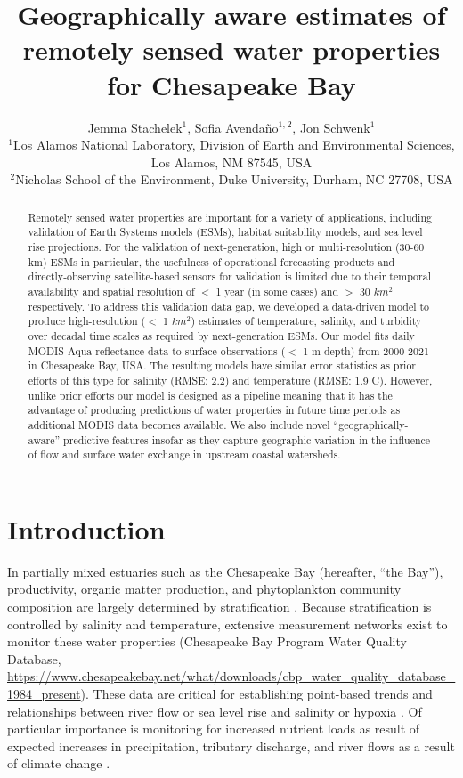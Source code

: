 \documentclass{article}
\title{Geographically aware estimates of remotely sensed water properties for Chesapeake Bay}
\author{Jemma Stachelek$^{1}$, Sofia Avendaño$^{1,}$$^{2}$, Jon Schwenk$^{1}$  \\
        \small $^{1}$Los Alamos National Laboratory, Division of Earth and Environmental Sciences, Los Alamos, NM 87545, USA \\
        \small $^{2}$Nicholas School of the Environment, Duke University, Durham, NC 27708, USA \\
}
\date{}
\begin{document}
\maketitle

\begin{abstract}
    \noindent Remotely sensed water properties are important for a variety of applications, including validation of Earth Systems models (ESMs), habitat suitability models, and sea level rise projections. For the validation of next-generation, high or multi-resolution (30-60 km) ESMs in particular, the usefulness of operational forecasting products and directly-observing satellite-based sensors for validation is limited due to their temporal availability and spatial resolution of $<$ 1 year (in some cases) and $>$ 30 $km^2$ respectively. To address this validation data gap, we developed a data-driven model to produce high-resolution ($<$ 1 $km^2$) estimates of temperature, salinity, and turbidity over decadal time scales as required by next-generation ESMs. Our model fits daily MODIS Aqua reflectance data to surface observations ($<$ 1 m depth) from 2000-2021 in Chesapeake Bay, USA. The resulting models have similar error statistics as prior efforts of this type for salinity (RMSE: 2.2) and temperature (RMSE: 1.9 C). However, unlike prior efforts our model is designed as a pipeline meaning that it has the advantage of producing predictions of water properties in future time periods as additional MODIS data becomes available. We also include novel  “geographically-aware” predictive features insofar as they capture geographic variation in the influence of flow and surface water exchange in upstream coastal watersheds.
    \end{abstract} \hspace{10pt}

\linenumbers

\section{Introduction}

In partially mixed estuaries such as the Chesapeake Bay (hereafter, “the Bay”), productivity, organic matter production, and phytoplankton community composition are largely determined by stratification \citep{xuClimateForcingSalinity2012}. Because stratification is controlled by salinity and temperature, extensive measurement networks exist to monitor these water properties (Chesapeake Bay Program Water Quality Database, \url{https://www.chesapeakebay.net/what/downloads/cbp_water_quality_database_1984_present}). These data are critical for establishing point-based trends and relationships between river flow or sea level rise and salinity or hypoxia \citet{hagyHypoxiaChesapeakeBay2004}. Of particular importance is monitoring for increased nutrient loads as result of expected increases in precipitation, tributary discharge, and river flows as a result of climate change \citep{najjarPotentialClimatechangeImpacts2010, irbyCompetingImpactsClimate2018}.
\end{document}
